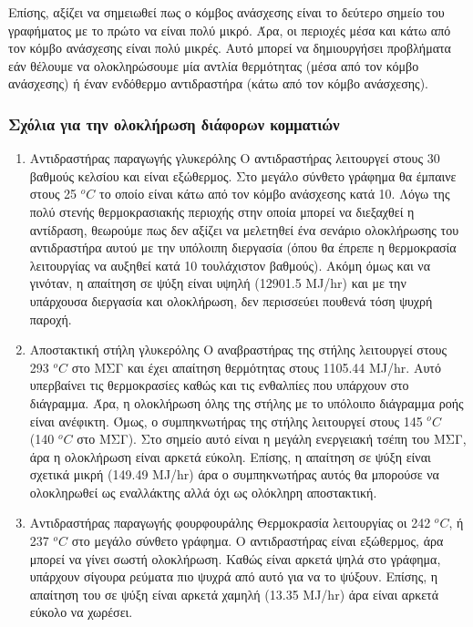 \documentclass[11pt]{article}
\begin{document}
Επίσης, αξίζει να σημειωθεί πως ο κόμβος ανάσχεσης είναι το δεύτερο σημείο του γραφήματος με το πρώτο να είναι πολύ μικρό. Άρα, οι περιοχές μέσα και κάτω από τον κόμβο ανάσχεσης είναι πολύ μικρές. Αυτό μπορεί να δημιουργήσει προβλήματα εάν θέλουμε να ολοκληρώσουμε μία αντλία θερμότητας (μέσα από τον κόμβο ανάσχεσης) ή έναν ενδόθερμο αντιδραστήρα (κάτω από τον κόμβο ανάσχεσης).

\subsubsection{Σχόλια για την ολοκλήρωση διάφορων κομματιών}
\label{sec:orgf13442a}
\begin{enumerate}
\item Αντιδραστήρας παραγωγής γλυκερόλης
\label{sec:orgba7b0c4}
Ο αντιδραστήρας λειτουργεί στους 30 βαθμούς κελσίου και είναι εξώθερμος. Στο μεγάλο σύνθετο γράφημα θα έμπαινε στους 25 \(^oC\) το οποίο είναι κάτω από τον κόμβο ανάσχεσης κατά 10. Λόγω της πολύ στενής θερμοκρασιακής περιοχής στην οποία μπορεί να διεξαχθεί η αντίδραση, θεωρούμε πως δεν αξίζει να μελετηθεί ένα σενάριο ολοκλήρωσης του αντιδραστήρα αυτού με την υπόλοιπη διεργασία (όπου θα έπρεπε η θερμοκρασία λειτουργίας να αυξηθεί κατά 10 τουλάχιστον βαθμούς). Ακόμη όμως και να γινόταν, η απαίτηση σε ψύξη είναι υψηλή (12901.5 MJ/hr) και με την υπάρχουσα διεργασία και ολοκλήρωση, δεν περισσεύει πουθενά τόση ψυχρή παροχή.
\item Αποστακτική στήλη γλυκερόλης
\label{sec:orgc1fc247}
Ο αναβραστήρας της στήλης λειτουργεί στους 293 \(^oC\) στο ΜΣΓ και έχει απαίτηση θερμότητας στους 1105.44 MJ/hr. Αυτό υπερβαίνει τις θερμοκρασίες καθώς και τις ενθαλπίες που υπάρχουν στο διάγραμμα. Άρα, η ολοκλήρωση όλης της στήλης με το υπόλοιπο διάγραμμα ροής είναι ανέφικτη. Όμως, ο συμπηκνωτήρας της στήλης λειτουργεί στους 145 \(^oC\) (140 \(^oC\) στο ΜΣΓ). Στο σημείο αυτό είναι η μεγάλη ενεργειακή τσέπη του ΜΣΓ, άρα η ολοκλήρωση είναι αρκετά εύκολη. Επίσης, η απαίτηση σε ψύξη είναι σχετικά μικρή (149.49 MJ/hr) άρα ο συμπηκνωτήρας αυτός θα μπορούσε να ολοκληρωθεί ως εναλλάκτης αλλά όχι ως ολόκληρη αποστακτική.
\item Αντιδραστήρας παραγωγής φουρφουράλης
\label{sec:orgb3f7918}
Θερμοκρασία λειτουργίας οι 242 \(^oC\), ή 237 \(^oC\) στο μεγάλο σύνθετο γράφημα. Ο αντιδραστήρας είναι εξώθερμος, άρα μπορεί να γίνει σωστή ολοκλήρωση. Καθώς είναι αρκετά ψηλά στο γράφημα, υπάρχουν σίγουρα ρεύματα πιο ψυχρά από αυτό για να το ψύξουν. Επίσης, η απαίτηση του σε ψύξη είναι αρκετά χαμηλή (13.35 MJ/hr) άρα είναι αρκετά εύκολο να χωρέσει.

\end{enumerate}
\end{document}
